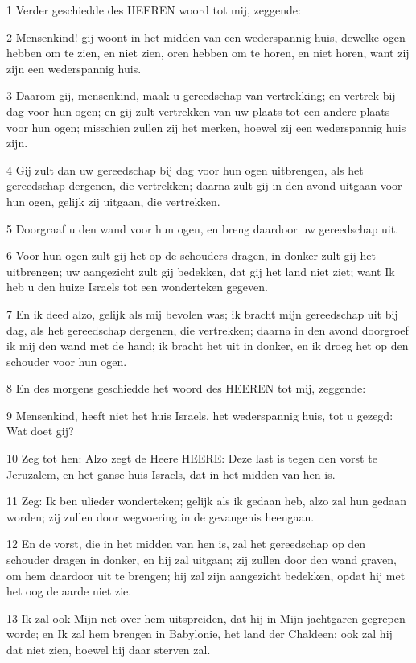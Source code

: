 \par 1 Verder geschiedde des HEEREN woord tot mij, zeggende:
\par 2 Mensenkind! gij woont in het midden van een wederspannig huis, dewelke ogen hebben om te zien, en niet zien, oren hebben om te horen, en niet horen, want zij zijn een wederspannig huis.
\par 3 Daarom gij, mensenkind, maak u gereedschap van vertrekking; en vertrek bij dag voor hun ogen; en gij zult vertrekken van uw plaats tot een andere plaats voor hun ogen; misschien zullen zij het merken, hoewel zij een wederspannig huis zijn.
\par 4 Gij zult dan uw gereedschap bij dag voor hun ogen uitbrengen, als het gereedschap dergenen, die vertrekken; daarna zult gij in den avond uitgaan voor hun ogen, gelijk zij uitgaan, die vertrekken.
\par 5 Doorgraaf u den wand voor hun ogen, en breng daardoor uw gereedschap uit.
\par 6 Voor hun ogen zult gij het op de schouders dragen, in donker zult gij het uitbrengen; uw aangezicht zult gij bedekken, dat gij het land niet ziet; want Ik heb u den huize Israels tot een wonderteken gegeven.
\par 7 En ik deed alzo, gelijk als mij bevolen was; ik bracht mijn gereedschap uit bij dag, als het gereedschap dergenen, die vertrekken; daarna in den avond doorgroef ik mij den wand met de hand; ik bracht het uit in donker, en ik droeg het op den schouder voor hun ogen.
\par 8 En des morgens geschiedde het woord des HEEREN tot mij, zeggende:
\par 9 Mensenkind, heeft niet het huis Israels, het wederspannig huis, tot u gezegd: Wat doet gij?
\par 10 Zeg tot hen: Alzo zegt de Heere HEERE: Deze last is tegen den vorst te Jeruzalem, en het ganse huis Israels, dat in het midden van hen is.
\par 11 Zeg: Ik ben ulieder wonderteken; gelijk als ik gedaan heb, alzo zal hun gedaan worden; zij zullen door wegvoering in de gevangenis heengaan.
\par 12 En de vorst, die in het midden van hen is, zal het gereedschap op den schouder dragen in donker, en hij zal uitgaan; zij zullen door den wand graven, om hem daardoor uit te brengen; hij zal zijn aangezicht bedekken, opdat hij met het oog de aarde niet zie.
\par 13 Ik zal ook Mijn net over hem uitspreiden, dat hij in Mijn jachtgaren gegrepen worde; en Ik zal hem brengen in Babylonie, het land der Chaldeen; ook zal hij dat niet zien, hoewel hij daar sterven zal.
